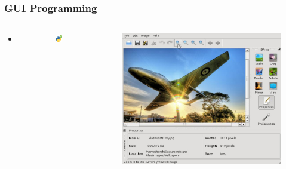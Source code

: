 \documentclass[compress=true]{beamer}
\begin{document}
\begin{frame}
	\frametitle{GUI Programming}
	\begin{columns}
		\begin{column}{0.2\textwidth}
			\begin{itemize}
				\item PyQt
			\end{itemize}
		\end{column}
		\begin{column}{0.4\textwidth}
			\begin{figure}
				\includegraphics[height=0.3\textheight]{pyqt.png}
			\end{figure}
		\end{column}
		\begin{column}{0.4\textwidth}
			\begin{figure}
				\includegraphics[height=0.3\textheight]{pyqt.jpg}
			\end{figure}
		\end{column}
	\end{columns}
	\begin{columns}
		\begin{column}{0.2\textwidth}

\end{column}
\end{columns}
\end{frame}
\end{document}
